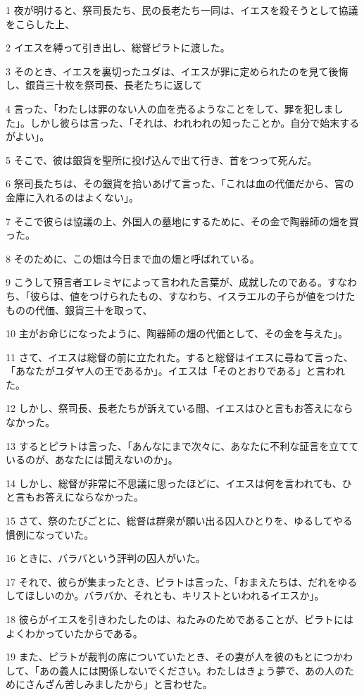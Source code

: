 \par 1 夜が明けると、祭司長たち、民の長老たち一同は、イエスを殺そうとして協議をこらした上、
\par 2 イエスを縛って引き出し、総督ピラトに渡した。
\par 3 そのとき、イエスを裏切ったユダは、イエスが罪に定められたのを見て後悔し、銀貨三十枚を祭司長、長老たちに返して
\par 4 言った、「わたしは罪のない人の血を売るようなことをして、罪を犯しました」。しかし彼らは言った、「それは、われわれの知ったことか。自分で始末するがよい」。
\par 5 そこで、彼は銀貨を聖所に投げ込んで出て行き、首をつって死んだ。
\par 6 祭司長たちは、その銀貨を拾いあげて言った、「これは血の代価だから、宮の金庫に入れるのはよくない」。
\par 7 そこで彼らは協議の上、外国人の墓地にするために、その金で陶器師の畑を買った。
\par 8 そのために、この畑は今日まで血の畑と呼ばれている。
\par 9 こうして預言者エレミヤによって言われた言葉が、成就したのである。すなわち、「彼らは、値をつけられたもの、すなわち、イスラエルの子らが値をつけたものの代価、銀貨三十を取って、
\par 10 主がお命じになったように、陶器師の畑の代価として、その金を与えた」。
\par 11 さて、イエスは総督の前に立たれた。すると総督はイエスに尋ねて言った、「あなたがユダヤ人の王であるか」。イエスは「そのとおりである」と言われた。
\par 12 しかし、祭司長、長老たちが訴えている間、イエスはひと言もお答えにならなかった。
\par 13 するとピラトは言った、「あんなにまで次々に、あなたに不利な証言を立てているのが、あなたには聞えないのか」。
\par 14 しかし、総督が非常に不思議に思ったほどに、イエスは何を言われても、ひと言もお答えにならなかった。
\par 15 さて、祭のたびごとに、総督は群衆が願い出る囚人ひとりを、ゆるしてやる慣例になっていた。
\par 16 ときに、バラバという評判の囚人がいた。
\par 17 それで、彼らが集まったとき、ピラトは言った、「おまえたちは、だれをゆるしてほしいのか。バラバか、それとも、キリストといわれるイエスか」。
\par 18 彼らがイエスを引きわたしたのは、ねたみのためであることが、ピラトにはよくわかっていたからである。
\par 19 また、ピラトが裁判の席についていたとき、その妻が人を彼のもとにつかわして、「あの義人には関係しないでください。わたしはきょう夢で、あの人のためにさんざん苦しみましたから」と言わせた。

